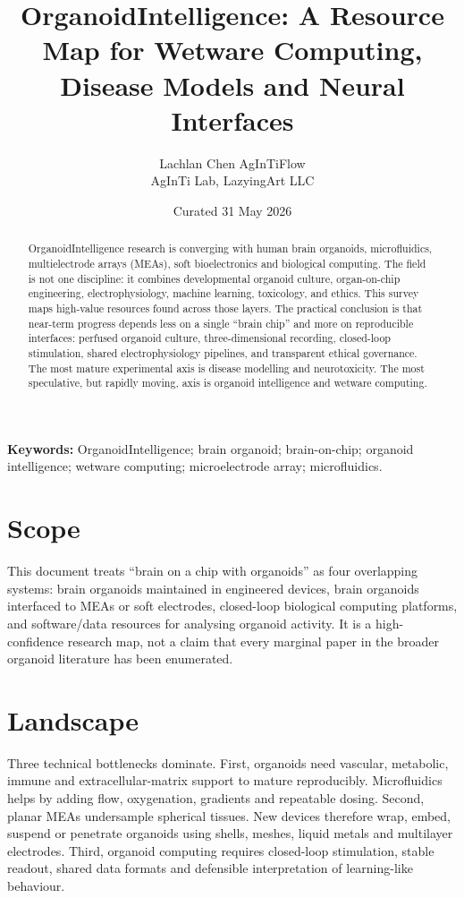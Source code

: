 \documentclass[10pt,twocolumn]{article}
\title{\vspace{-1.5em}\bfseries OrganoidIntelligence: A Resource Map for Wetware Computing, Disease Models and Neural Interfaces}
\author{\begin{tabular}{c}Lachlan Chen \quad AgInTiFlow\\AgInTi Lab, LazyingArt LLC\end{tabular}}
\date{Curated 31 May 2026}
\begin{document}
\maketitle

\begin{abstract}
\noindent OrganoidIntelligence research is converging with human brain organoids, microfluidics, multielectrode arrays (MEAs), soft bioelectronics and biological computing. The field is not one discipline: it combines developmental organoid culture, organ-on-chip engineering, electrophysiology, machine learning, toxicology, and ethics. This survey maps high-value resources found across those layers. The practical conclusion is that near-term progress depends less on a single ``brain chip'' and more on reproducible interfaces: perfused organoid culture, three-dimensional recording, closed-loop stimulation, shared electrophysiology pipelines, and transparent ethical governance. The most mature experimental axis is disease modelling and neurotoxicity. The most speculative, but rapidly moving, axis is organoid intelligence and wetware computing.
\end{abstract}

\textbf{Keywords:} OrganoidIntelligence; brain organoid; brain-on-chip; organoid intelligence; wetware computing; microelectrode array; microfluidics.

\section{Scope}

This document treats ``brain on a chip with organoids'' as four overlapping systems: brain organoids maintained in engineered devices, brain organoids interfaced to MEAs or soft electrodes, closed-loop biological computing platforms, and software/data resources for analysing organoid activity. It is a high-confidence research map, not a claim that every marginal paper in the broader organoid literature has been enumerated.

\section{Landscape}

Three technical bottlenecks dominate. First, organoids need vascular, metabolic, immune and extracellular-matrix support to mature reproducibly. Microfluidics helps by adding flow, oxygenation, gradients and repeatable dosing. Second, planar MEAs undersample spherical tissues. New devices therefore wrap, embed, suspend or penetrate organoids using shells, meshes, liquid metals and multilayer electrodes. Third, organoid computing requires closed-loop stimulation, stable readout, shared data formats and defensible interpretation of learning-like behaviour.
\end{document}
